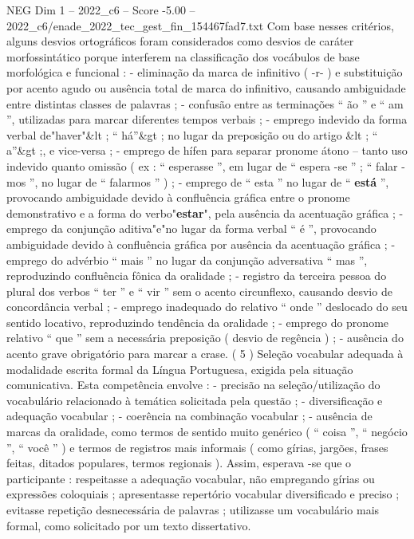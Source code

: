 \begin{textsample}{NEG Dim 1 – 2022\_c6 – Score -5.00 – 2022\_c6/enade\_2022\_tec\_gest\_fin\_154467fad7.txt}
Com base nesses critérios, alguns desvios ortográficos foram considerados como desvios de caráter morfossintático porque interferem na classificação dos vocábulos de base morfológica e funcional : - eliminação da marca de infinitivo ( -r- ) e substituição por acento agudo ou ausência total de marca do infinitivo, causando ambiguidade entre distintas classes de palavras ; - confusão entre as terminações “ ão ” e “ am ”, utilizadas para marcar diferentes tempos verbais ; - emprego indevido da forma verbal de"haver"\&lt ; “ há”\&gt ; no lugar da preposição ou do artigo \&lt ; “ a”\&gt ;, e vice-versa ; - emprego de hífen para separar pronome átono – tanto uso indevido quanto omissão ( ex : “ esperasse ”, em lugar de “ espera -se ” ; “ falar -mos ”, no lugar de “ falarmos ” ) ; - emprego de “ esta ” no lugar de “ \textbf{está} ”, provocando ambiguidade devido à confluência gráfica entre o pronome demonstrativo e a forma do verbo"\textbf{estar}", pela ausência da acentuação gráfica ; - emprego da conjunção aditiva"e"no lugar da forma verbal “ é ”, provocando ambiguidade devido à confluência gráfica por ausência da acentuação gráfica ; - emprego do advérbio “ mais ” no lugar da conjunção adversativa “ mas ”, reproduzindo confluência fônica da oralidade ; - registro da terceira pessoa do plural dos verbos “ ter ” e “ vir ” sem o acento circunflexo, causando desvio de concordância verbal ; - emprego inadequado do relativo “ onde ” deslocado do seu sentido locativo, reproduzindo tendência da oralidade ; - emprego do pronome relativo “ que ” sem a necessária preposição ( desvio de regência ) ; - ausência do acento grave obrigatório para marcar a crase. ( 5 ) Seleção vocabular adequada à modalidade escrita formal da Língua Portuguesa, exigida pela situação comunicativa.
Esta competência envolve : - precisão na seleção/utilização do vocabulário relacionado à temática solicitada pela questão ; - diversificação e adequação vocabular ; - coerência na combinação vocabular ; - ausência de marcas da oralidade, como termos de sentido muito genérico ( “ coisa ”, “ negócio ”, “ você ” ) e termos de registros mais informais ( como gírias, jargões, frases feitas, ditados populares, termos regionais ).
Assim, esperava -se que o participante : respeitasse a adequação vocabular, não empregando gírias ou expressões coloquiais ; apresentasse repertório vocabular diversificado e preciso ; evitasse repetição desnecessária de palavras ; utilizasse um vocabulário mais formal, como solicitado por um texto dissertativo.

\end{textsample}
